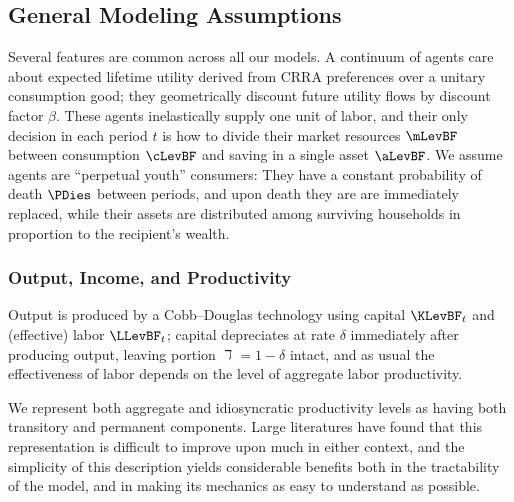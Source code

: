 \documentclass[titlepage]{\econtex}\newcommand{\texname}{cAndCwithStickyE}
\begin{document}
\subsection{General Modeling Assumptions}
\label{section:Models}

Several features are common across all our models.  A continuum of agents care about expected lifetime utility derived from CRRA preferences over a unitary consumption good; they geometrically discount future utility flows by discount factor $\beta$.  These agents inelastically supply one unit of labor, and their only decision in each period $t$ is how to divide their market resources $\mLevBF$ between consumption $\cLevBF$ and saving in a single asset $\aLevBF$.  We assume agents are \cite{blanchardFinite} ``perpetual youth'' consumers: They have a constant probability of death $\PDies$ between periods, and upon death they are are immediately replaced, while their assets are distributed among surviving households in proportion to the recipient's wealth.

\subsubsection{Output, Income, and Productivity}

Output is produced by a Cobb--Douglas technology using capital $\KLevBF_t$ and (effective) labor $\LLevBF_t$; capital depreciates at rate $\delta$ immediately after producing output, leaving portion $\daleth=1-\delta$ intact, and as usual the effectiveness of labor depends on the level of aggregate labor productivity.

We represent both aggregate and idiosyncratic productivity levels as having both transitory and permanent components.  Large literatures have found that this representation is difficult to improve upon much in either context, and the simplicity of this description yields considerable benefits both in the tractability of the model, and in making its mechanics as easy to understand as possible.
\end{document}
